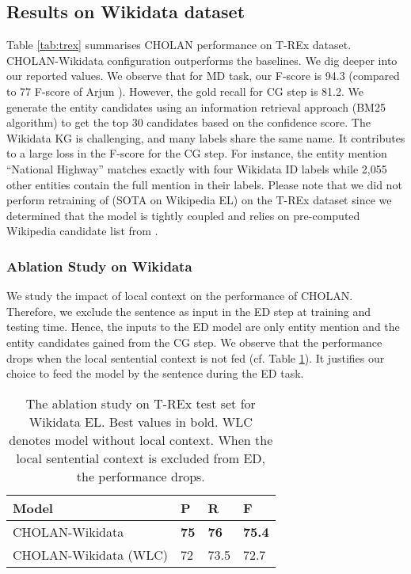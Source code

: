 \documentclass[11pt,a4paper]{article}
\begin{document}
\subsection{Results on Wikidata dataset}
Table \ref{tab:trex} summarises CHOLAN performance on T-REx dataset. CHOLAN-Wikidata configuration outperforms the baselines. We dig deeper into our reported values. We observe that for MD task, our F-score is 94.3 (compared to 77 F-score of Arjun \cite{Mulang2019ContextawareEL}). However, the gold recall for CG step is 81.2. We generate the entity candidates using an information retrieval approach (BM25 algorithm) to get the top 30 candidates based on the confidence score. The Wikidata KG is challenging, and many labels share the same name. It contributes to a large loss in the F-score for the CG step. For instance, the entity mention ``National Highway'' matches exactly with four Wikidata ID labels while 2,055 other entities contain the full mention in their labels. Please note that we did not perform retraining of \cite{kolitsas2018end} (SOTA on Wikipedia EL) on the T-REx dataset since we determined that the model is tightly coupled and relies on pre-computed Wikipedia candidate list from \cite{ganea2017deep}. 

\subsubsection{Ablation Study on Wikidata}
We study the impact of local context on the performance of CHOLAN. Therefore, we exclude the sentence as input in the ED step at training and testing time. Hence, the inputs to the ED model are only entity mention and the entity candidates gained from the CG step. We observe that the performance drops when the local sentential context is not fed (cf. Table \ref{tab:trexcontext}). It justifies our choice to feed the model by the sentence during the ED task. 


\begin{table}[!htp]
    \centering
    \begin{tabular}{p{3.70cm}p{0.6cm}p{0.60cm}p{0.60cm} }
     
\toprule
     \textbf{Model} & \textbf{P} & \textbf{R} & \textbf{F}\\
\midrule
     CHOLAN-Wikidata &  \textbf{75}  & \textbf{76} &\textbf{75.4}\\
     CHOLAN-Wikidata (WLC) & 72 & 73.5  & 72.7\\
\bottomrule
    \end{tabular}
    \caption{The ablation study on T-REx test set for Wikidata EL. Best values in bold. WLC denotes model without local context. When the local sentential context is excluded from ED, the performance drops.}
    \label{tab:trexcontext}
    \vspace{-2mm}
\end{table}
\end{document}
